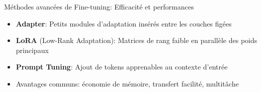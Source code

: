 \documentclass[aspectratio=169]{beamer}
\begin{document}
\begin{frame}{Méthodes avancées de Fine-tuning: Efficacité et performances}
    \begin{itemize}
        \item \textbf{Adapter}: Petits modules d'adaptation insérés entre les couches figées
        \item \textbf{LoRA} (Low-Rank Adaptation): Matrices de rang faible en parallèle des poids principaux
        \item \textbf{Prompt Tuning}: Ajout de tokens apprenables au contexte d'entrée
        \item Avantages communs: économie de mémoire, transfert facilité, multitâche
    \end{itemize}
\end{frame}
\end{document}
